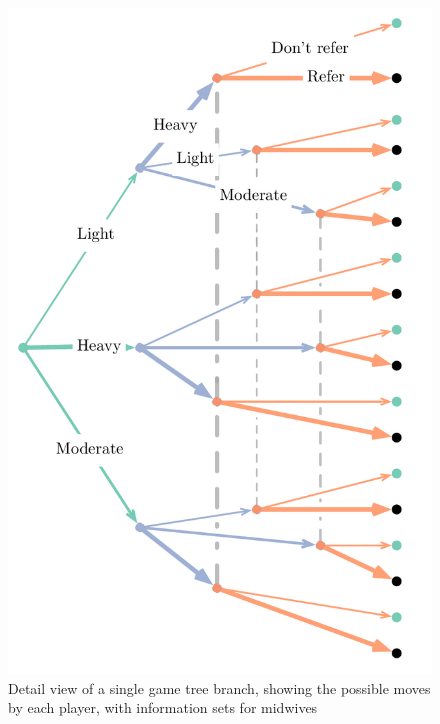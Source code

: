 \begin{figure}[H]
\begin{adjustbox}{center}
\includegraphics[width=119mm]{figures/tree_zoom}
\end{adjustbox}
\caption{Detail view of a single game tree branch, showing the possible moves by each player, with information sets for midwives}

\label{fig:zoom_tree}
\end{figure}

